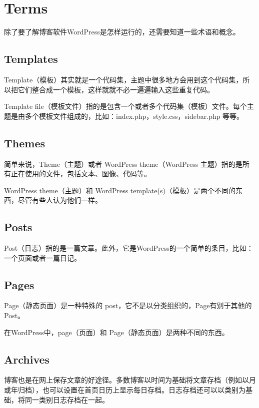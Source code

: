 \chapter{Terms}

除了要了解博客软件WordPress是怎样运行的，还需要知道一些术语和概念。

\section{Templates}


Template（模板）其实就是一个代码集，主题中很多地方会用到这个代码集，所以把它们整合成一个模板，这样就就不必一遍遍输入这些重复代码。

Template file（模板文件）指的是包含一个或者多个代码集（模板）文件。每个主题是由多个模板文件组成的，比如：index.php，style.css，sidebar.php 等等。

\section{Themes}

简单来说，Theme（主题）或者 WordPress theme（WordPress 主题）指的是所有正在使用的文件，包括文本、图像、代码等。

WordPress theme（主题）和 WordPress template(s)（模板）是两个不同的东西，尽管有些人认为他们一样。


\section{Posts}


Post（日志）指的是一篇文章。此外，它是WordPress的一个简单的条目，比如：一个页面或者一篇日记。

\section{Pages}

Page（静态页面）是一种特殊的 post，它不是以分类组织的，Page有别于其他的Post。

在WordPress中，page（页面）和 Page（静态页面）是两种不同的东西。





\section{Archives}

博客也是在网上保存文章的好途径。多数博客以时间为基础将文章存档（例如以月或年归档），也可以设置在首页日历上显示每日存档。日志存档还可以以类别为基础，将同一类别日志存档在一起。

